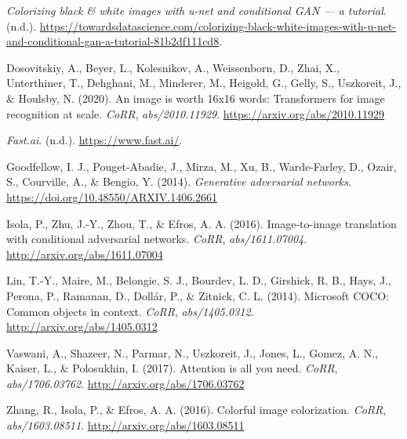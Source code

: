 \documentclass[
]{article}
\newlength{\cslhangindent}
\newlength{\cslentryspacingunit} %
\newenvironment{CSLReferences}[2] %
 {%
  \setlength{\parindent}{0pt}
  \ifodd #1
  \let\oldpar\par
  \def\par{\hangindent=\cslhangindent\oldpar}
  \fi
  \setlength{\parskip}{#2\cslentryspacingunit}
 }%
 {}
\begin{document}
\hypertarget{refs}{}
\begin{CSLReferences}{1}{0}
\leavevmode{}%
\emph{Colorizing black \& white images with u-net and conditional GAN
--- a tutorial}. (n.d.).
\url{https://towardsdatascience.com/colorizing-black-white-images-with-u-net-and-conditional-gan-a-tutorial-81b2df111cd8}.

\leavevmode{}%
Dosovitskiy, A., Beyer, L., Kolesnikov, A., Weissenborn, D., Zhai, X.,
Unterthiner, T., Dehghani, M., Minderer, M., Heigold, G., Gelly, S.,
Uszkoreit, J., \& Houlsby, N. (2020). An image is worth 16x16 words:
Transformers for image recognition at scale. \emph{CoRR},
\emph{abs/2010.11929}. \url{https://arxiv.org/abs/2010.11929}

\leavevmode{}%
\emph{Fast.ai}. (n.d.). \url{https://www.fast.ai/}.

\leavevmode{}%
Goodfellow, I. J., Pouget-Abadie, J., Mirza, M., Xu, B., Warde-Farley,
D., Ozair, S., Courville, A., \& Bengio, Y. (2014). \emph{Generative
adversarial networks}. \url{https://doi.org/10.48550/ARXIV.1406.2661}

\leavevmode{}%
Isola, P., Zhu, J.-Y., Zhou, T., \& Efros, A. A. (2016). Image-to-image
translation with conditional adversarial networks. \emph{CoRR},
\emph{abs/1611.07004}. \url{http://arxiv.org/abs/1611.07004}

\leavevmode{}%
Lin, T.-Y., Maire, M., Belongie, S. J., Bourdev, L. D., Girshick, R. B.,
Hays, J., Perona, P., Ramanan, D., Dollár, P., \& Zitnick, C. L. (2014).
Microsoft {COCO:} Common objects in context. \emph{CoRR},
\emph{abs/1405.0312}. \url{http://arxiv.org/abs/1405.0312}

\leavevmode{}%
Vaswani, A., Shazeer, N., Parmar, N., Uszkoreit, J., Jones, L., Gomez,
A. N., Kaiser, L., \& Polosukhin, I. (2017). Attention is all you need.
\emph{CoRR}, \emph{abs/1706.03762}.
\url{http://arxiv.org/abs/1706.03762}

\leavevmode{}%
Zhang, R., Isola, P., \& Efros, A. A. (2016). Colorful image
colorization. \emph{CoRR}, \emph{abs/1603.08511}.
\url{http://arxiv.org/abs/1603.08511}

\end{CSLReferences}
\end{document}
